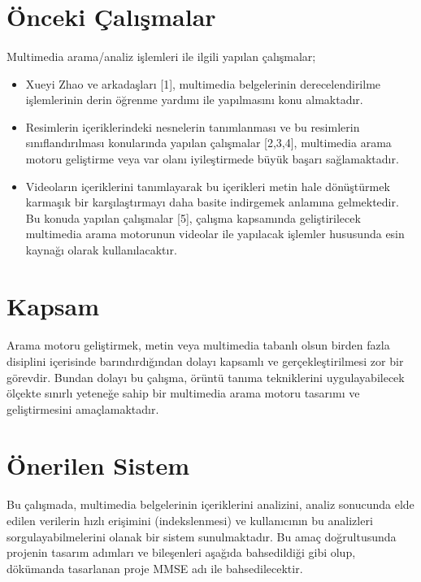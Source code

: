 \documentclass[11pt,a4paper]{article}
\begin{document}
\section{Önceki Çalışmalar}
\paragraph{}
Multimedia arama/analiz işlemleri ile ilgili yapılan çalışmalar;
\begin{itemize}
\item Xueyi Zhao ve arkadaşları [1], multimedia belgelerinin derecelendirilme işlemlerinin derin öğrenme yardımı ile yapılmasını konu almaktadır.
\item Resimlerin içeriklerindeki nesnelerin tanımlanması ve bu resimlerin sınıflandırılması konularında yapılan çalışmalar [2,3,4], multimedia arama motoru geliştirme veya var olanı iyileştirmede büyük başarı sağlamaktadır.
\item Videoların içeriklerini tanımlayarak bu içerikleri metin hale dönüştürmek karmaşık bir karşılaştırmayı daha basite indirgemek anlamına gelmektedir. Bu konuda yapılan çalışmalar [5], çalışma kapsamında geliştirilecek multimedia arama motorunun videolar ile yapılacak işlemler hususunda esin kaynağı olarak kullanılacaktır.
\end{itemize}


\section{Kapsam}
\paragraph{}
Arama motoru geliştirmek, metin veya multimedia tabanlı olsun birden fazla disiplini içerisinde barındırdığından dolayı kapsamlı ve gerçekleştirilmesi zor bir görevdir. Bundan dolayı bu çalışma, örüntü tanıma tekniklerini uygulayabilecek ölçekte sınırlı yeteneğe sahip bir multimedia arama motoru tasarımı ve geliştirmesini amaçlamaktadır. 

\section{Önerilen Sistem}
\paragraph{}
Bu çalışmada, multimedia belgelerinin içeriklerini analizini, analiz sonucunda elde edilen verilerin hızlı erişimini (indekslenmesi) ve kullanıcının bu analizleri sorgulayabilmelerini olanak bir sistem sunulmaktadır. Bu amaç doğrultusunda projenin tasarım adımları ve bileşenleri aşağıda bahsedildiği gibi olup, dökümanda tasarlanan proje MMSE adı ile bahsedilecektir.
\end{document}
